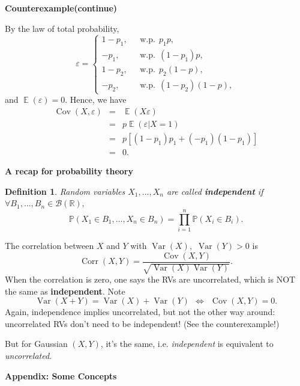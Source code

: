 \documentclass[19pt,landscaoe]{article}
\newtheorem{defi}[thm]{Definition}
\newcommand{\IP}{\mathbb{P}}
\DeclareMathOperator{\E}{\mathbb{E}}
\newcommand{\R}{\mathbb{R}}
\DeclareMathOperator{\Var}{\mathrm{Var}}
\DeclareMathOperator{\var}{\mathrm{Var}}
\DeclareMathOperator{\cov}{\mathrm{Cov}}
\DeclareMathOperator{\corr}{\mathrm{Corr}}
\begin{document}
\newpage
{\LARGE\centerline{\textbf{Counterexample(continue)}}}
\vskip25pt
\begin{minipage}{.9\textwidth}
    \Large 
    By the law of total probability, 
    \begin{equation*}
        \varepsilon=\begin{cases}
            1-p_1,~~~&\mathrm{w.p.}~~p_1p,\\
            -p_1,~~~&\mathrm{w.p.}~~(1-p_1)p,\\
            1-p_2,~~~&\mathrm{w.p.}~~p_2(1-p),\\
            -p_2,~~~&\mathrm{w.p.}~~(1-p_2)(1-p),
        \end{cases}
    \end{equation*}
 and  $\E(\varepsilon)=0$. Hence, we have 
   \begin{eqnarray*}
    \cov(X,\varepsilon)&=&\E(X\varepsilon)\\
    &=&p\E(\varepsilon|X=1)\\
    &=&p[(1-p_1)p_1+(-p_1)(1-p_1)]\\
    &=&0.
   \end{eqnarray*}
\end{minipage}

\newpage
{\LARGE\centerline{\textbf{A recap for probability theory}}}
\vskip25pt
\begin{minipage}{.9\textwidth}
   \large
\begin{defi}
    Random variables $X_1,\dots,X_n$ are called {\bf independent} if ~$\forall B_1,\dots,B_n\in\mathcal{B}(\R),$
    $$\IP(X_1\in B_1,\dots,X_n\in B_n)=\prod_{i=1}^n\IP(X_i\in B_i).$$
\end{defi}
   The correlation between $X$ and $Y$ with $\Var(X),$ $\Var(Y)>0$ is 
   $$\corr(X,Y)=\frac{\cov(X,Y)}{\sqrt{\var(X)\var(Y)}}.$$
   When the correlation is zero, one says the RVs are uncorrelated, which is NOT the same as {\bf independent}. Note 
   $$\Var(X+Y)=\Var(X)+\Var(Y)~~\Leftrightarrow~~\cov(X,Y)=0.$$
 Again, independence implies uncorrelated, but not the other way around: uncorrelated RVs don't need to be independent! (See the counterexample!)
   
   \vskip 5pt
   But for Gaussian $(X,Y)$, it's the same, i.e. {\it independent} is equivalent to {\it uncorrelated}. 
\end{minipage}

\newpage

\newpage
{\LARGE\centerline{\textbf{Appendix: Some Concepts}}}
\vskip25pt
   \large
\end{document}

